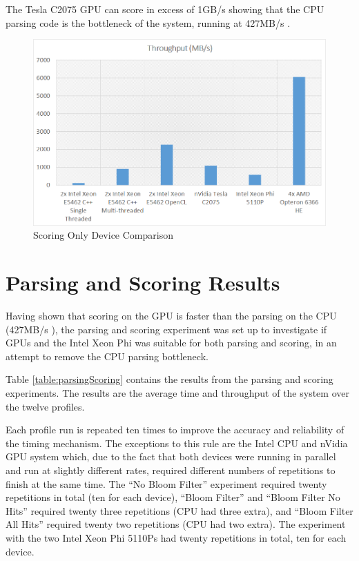 The Tesla C2075 GPU can score in excess of 1GB/s showing that the CPU parsing
code is the bottleneck of the system, running at 427MB/s \cite{HybridCPUFPGA}.

\begin{figure}[H]
\centering
\includegraphics[width=\linewidth]{images/scoringOnlyBest.png}
\caption{Scoring Only Device Comparison}
\label{fig:scoringOnlyBest}
\end{figure}

\section{Parsing and Scoring Results}

Having shown that scoring on the GPU is faster than the parsing on the CPU
(427MB/s \cite{HybridCPUFPGA}), the parsing and scoring experiment was set up
to investigate if GPUs and the Intel Xeon Phi was suitable for both parsing
and scoring, in an attempt to remove the CPU parsing bottleneck.

Table \ref{table:parsingScoring} contains the results from the parsing and
scoring experiments. The results are the average time and throughput of the
system over the twelve profiles.

Each profile run is repeated ten times to improve the accuracy and reliability
of the timing mechanism. The exceptions to this rule are the Intel CPU and
nVidia GPU system which, due to the fact that both devices were running in
parallel and run at slightly different rates, required different numbers of
repetitions to finish at the same time. The ``No Bloom Filter'' experiment
required twenty repetitions in total (ten for each device), ``Bloom Filter'' and
``Bloom Filter No Hits'' required twenty three repetitions (CPU had three
extra), and ``Bloom Filter All Hits'' required twenty two repetitions (CPU had
two extra). The experiment with the two Intel Xeon Phi 5110Ps had twenty
repetitions in total, ten for each device.

